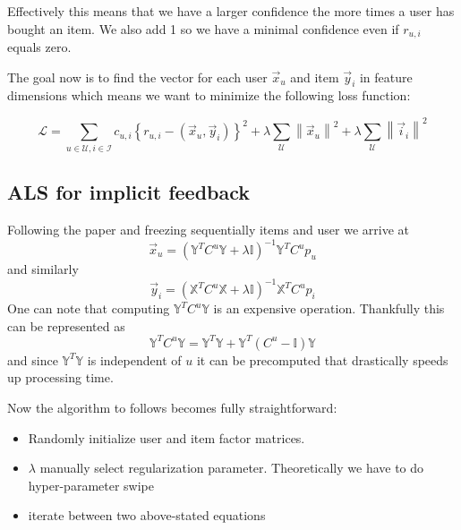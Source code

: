 \documentclass[12pt]{article}
\newcommand{\norm}[1]{\left\lVert#1\right\rVert}
\begin{document}
Effectively this means that we have a larger confidence the more times a user has bought an item. We also add 1 so we have a minimal confidence even if  $r_{u,i}$ equals zero. 

The goal now is to find the vector for each user $\vec{x}_u$ and item $\vec{y}_i$ in feature dimensions which means we want to minimize the following loss function:

\begin{equation}
\mathcal{L} = \sum_{u \in \mathcal{U}, i \in \mathcal{I}} 
c_{u,i}\left\{r_{u,i}-(\vec{x}_u, \vec{y}_i)\right\} ^2
+ 
\lambda \sum_{\mathcal{U}}\norm{\vec{x}_u}^2
+ 
\lambda \sum_{\mathcal{U}}\norm{\vec{i}_i}^2
\end{equation}
\subsection{ALS for implicit feedback}
Following the paper and freezing sequentially items and user we arrive at
\begin{equation}
\vec{x}_u = \left(
\mathbb{Y}^TC^u\mathbb{Y} + \lambda\mathbb{I}
\right)^{-1}\mathbb{Y}^TC^u p_u
\end{equation} 
and similarly
\begin{equation}
\vec{y}_i = \left(
\mathbb{X}^TC^u\mathbb{X} + \lambda\mathbb{I}
\right)^{-1}\mathbb{X}^TC^u p_i
\end{equation} 
One can note that computing $\mathbb{Y}^TC^u\mathbb{Y}$ is an expensive operation. Thankfully this can be represented as 
\begin{equation}
\mathbb{Y}^TC^u\mathbb{Y} = \mathbb{Y}^T\mathbb{Y}+ \mathbb{Y}^T\left(C^u-\mathbb{I}\right)\mathbb{Y}
\end{equation}
and since $ \mathbb{Y}^T\mathbb{Y}$ is independent of $u$ it can be precomputed that drastically speeds up processing time.

Now the algorithm to follows becomes fully straightforward:
\begin{itemize}
\item Randomly initialize user and item factor matrices. 
\item $\lambda$ manually select regularization parameter. Theoretically we have to do hyper-parameter swipe
\item iterate between two above-stated equations
\end{itemize}
\newpage
\end{document}
